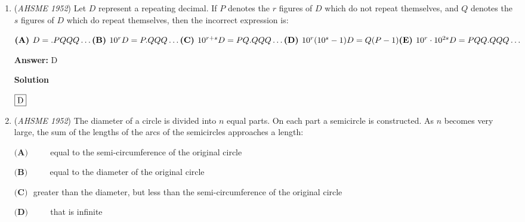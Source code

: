 \begin{enumerate}
 $\text{(A) } 2 \qquad \text{(B) } 4 \qquad \text{(C) } 6 \qquad \text{(D) } 6\pi \qquad \text{(E) } 8$

 \textbf{Answer: }C



\textbf{Solution 1}

We know that the volume of a cylinder is equal to $\pi r^2h$, where $r$ and $h$ are the radius and height, respectively. So we know that $2\pi (r+6)^2-2\pi r^2=y=\pi r^2(2+6)-2\pi r^2$. Expanding and rearranging, we get that $2\pi (12r+36)=6\pi r^2$. Divide both sides by $6\pi$ to get that $4r+12=r^2$, and rearrange to see that $r^2-4r-12=0$. This factors to become $(r-6)(r+2)=0$, so $r=6$ or $r=-2$. Obviously, the radius cannot be negative, so our answer is $\fbox{(C) 6}$



	\item (\textit{AHSME 1952}) Let $D$ represent a repeating decimal. If $P$ denotes the $r$ figures of $D$ which do not repeat themselves, and $Q$ denotes the $s$ figures of $D$ which do repeat themselves, then the incorrect expression is:


 $\textbf{(A) } D = .PQQQ\ldots \qquad\\ \textbf{(B) } 10^rD = P.QQQ\ldots \\ \textbf{(C) } 10^{r + s}D = PQ.QQQ\ldots \qquad\\ \textbf{(D) } 10^r(10^s - 1)D = Q(P - 1) \\ \textbf{(E) } 10^r\cdot10^{2s}D = PQQ.QQQ\ldots$

 \textbf{Answer: }D



\textbf{Solution}

$\fbox{D}$



	\item (\textit{AHSME 1952}) The diameter of a circle is divided into $n$ equal parts. On each part a semicircle is constructed. As $n$ becomes very large, the sum of the lengths of the arcs of the semicircles approaches a length: 


 $\textbf{(A) } \qquad$ equal to the semi-circumference of the original circle


 $\textbf{(B) } \qquad$ equal to the diameter of the original circle


 $\textbf{(C) }$ greater than the diameter, but less than the semi-circumference of the original circle


 $\textbf{(D) } \qquad$ that is infinite



\end{enumerate}
